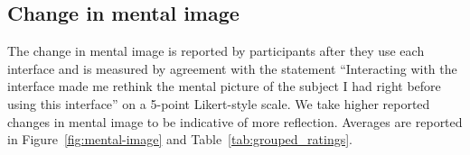 


\subsection{Change in mental image}
\label{change-mental-image}

The change in mental image is reported by participants after they use each interface and is measured by agreement with the statement ``Interacting with the interface made me rethink the mental picture of the subject I had right before using this interface'' on a 5-point Likert-style scale.
We take higher reported changes in mental image to be indicative of more reflection.
Averages are reported in Figure~\ref{fig:mental-image} and Table~\ref{tab:grouped_ratings}. 

